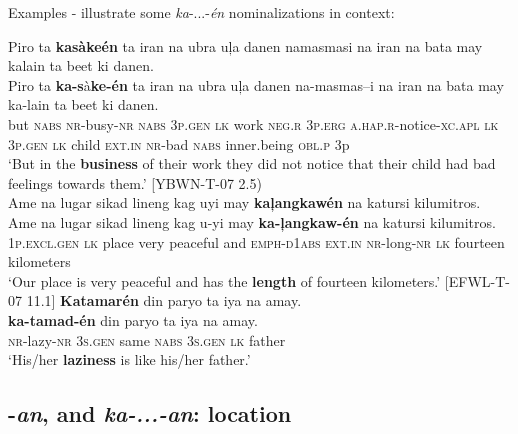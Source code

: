 Examples - illustrate some \textit{ka}{}-...-\textit{én} nominalizations in context:

\ea
\label{bkm:Ref116398555}
Piro  ta  \textbf{kasàkeén}  ta  iran  na  ubra  uļa  danen  namasmasi  na  iran  na  bata  may  kalain  ta  beet  ki  danen. \\\smallskip
 \gll Piro  ta  \textbf{ka-s}à\textbf{ke-én}  ta  iran  na  ubra  uļa  danen  na-masmas--i  na  iran  na  bata  may  ka-lain  ta  beet  ki  danen. \\
but  \textsc{nabs}  \textsc{nr}-busy-\textsc{nr}  \textsc{nabs}  3\textsc{p.gen}  \textsc{lk}  work  \textsc{neg.r}  3\textsc{p.erg}  \textsc{a.hap.r}-notice-\textsc{xc.apl} \textsc{lk}  \textsc{3}\textsc{p.gen}  \textsc{lk}  child  \textsc{ext.in}  \textsc{nr}-bad  \textsc{nabs}  inner.being  \textsc{obl.p}  3p \\
\glt `But in the \textbf{business} of their work they did not notice that their child had bad feelings towards them.’ [YBWN-T-07 2.5) \\
\z
\ea
Ame  na  lugar  sikad  lineng  kag  uyi may  \textbf{kaļangkawén}  na  katursi  kilumitros. \\\smallskip
 \gll Ame  na  lugar  sikad  lineng  kag\footnotemark{}  u-yi may  \textbf{ka-ļangkaw-én}  na  katursi  kilumitros. \\
1\textsc{p.excl.gen}  \textsc{lk}  place  very  peaceful  and  \textsc{emph-d1abs} \textsc{ext.in}  \textsc{nr}-long-\textsc{nr}  \textsc{lk}  fourteen  kilometers \\
\glt `Our place is very peaceful and has the \textbf{length} of fourteen kilometers.’ [EFWL-T-07 11.1]
\z
\ea
\label{bkm:Ref116398718}
\textbf{Katamarén}  din  paryo  ta  iya  na  amay. \\\smallskip
 \gll \textbf{ka-tamad-én}  din  paryo  ta  iya  na  amay. \\
\textsc{nr}-lazy-\textsc{nr}  3\textsc{s.gen}  same  \textsc{nabs}  3\textsc{s.gen}  \textsc{lk}  father \\
\glt ‘His/her \textbf{laziness} is like his/her father.’
\z

\subsection{{}-\textit{an}, and \textit{ka-...-an}: location}
\label{sec:ka-an}

